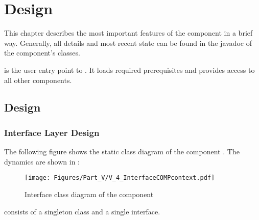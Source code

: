 
\chapter{\SUBSBootstrap{} Design}
\label{sec:COMPcontextDesign}

This chapter describes the most important features of the \COMPcontext{} component in a brief way. Generally, all details and most recent state can be found in the javadoc of the component's classes.

\COMPcontext{} is the user entry point to \LibName{}. It loads required prerequisites and provides access to all other \LibName{} components.


\section{\COMPcontext{} Design}
\label{sec:COMPcontextDesign2}


\subsection{Interface Layer Design}
\label{sec:InterfaceDesignCOMPcontext}

The following figure shows the static class diagram of the component \COMPcontext{}. The dynamics are shown in :

\begin{figure}[H]
	\centering
	\texttt{[image: Figures/Part\_V/V\_4\_InterfaceCOMPcontext.pdf]}
	\caption{Interface class diagram of the component \COMPcontext{}}
	\label{fig:V_4_InterfaceCOMPcontext}
\end{figure}

\COMPcontext{} consists of a singleton class and a single \ComponentRegistry{} interface.


